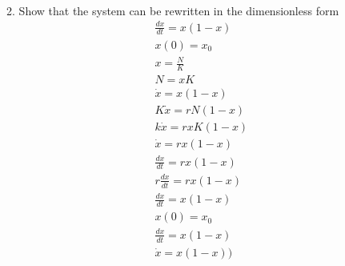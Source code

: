 \documentclass[a4paper,10pt]{article}
\begin{document}
\begin{enumerate}
\begin{enumerate}
\begin{equation}
\begin{aligned}
                    \end{aligned}
                \end{equation}
            \item Show that the system can be rewritten in the dimensionless form
                \begin{equation}
                    \begin{aligned}
                        \frac{dx}{dt}=x(1-x)\\
                        x(0)= x_{0}\\
                        x=\frac{N}{K}\\
                        N=xK\\
                        \dot{x}=x(1-x)\\
                        K\dot{x}=rN(1-x)\\
                        k\dot{x}=rxK(1-x)\\
                        \dot{x}=rx(1-x)\\
                        \frac{dx}{dt}=rx(1-x)\\
                        r \frac{dx}{dt}=rx(1-x)\\
                        \frac{dx}{dt}=x(1-x)\\
                        x(0)=x_{0}\\
                        \boxed{\frac{dx}{dt}=x(1-x)}\\
                        \boxed{\dot{x}=x(1-x))}


\end{aligned}
\end{equation}
\end{enumerate}
\end{enumerate}
\end{document}
